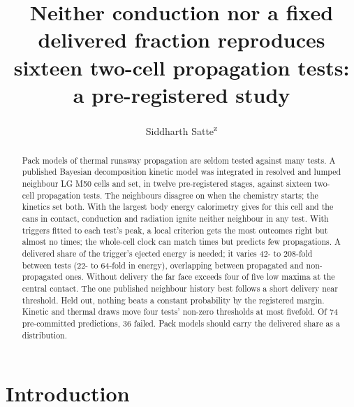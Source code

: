 \documentclass[preprint,12pt]{elsarticle}
\begin{document}
\begin{frontmatter}

\title{Neither conduction nor a fixed delivered fraction reproduces sixteen two-cell propagation tests: a pre-registered study}

\author{Siddharth Satte\textsuperscript{z}}
\address{Independent researcher, Pune, India\\[4pt]\textsuperscript{z}E-mail: siddharth161204@gmail.com}

\begin{abstract}
Pack models of thermal runaway propagation are seldom tested against many tests. A published Bayesian decomposition kinetic model was integrated in resolved and lumped neighbour LG M50 cells and set, in twelve pre-registered stages, against sixteen two-cell propagation tests. The neighbours disagree on when the chemistry starts; the kinetics set both. With the largest body energy calorimetry gives for this cell and the cans in contact, conduction and radiation ignite neither neighbour in any test. With triggers fitted to each test's peak, a local criterion gets the most outcomes right but almost no times; the whole-cell clock can match times but predicts few propagations. A delivered share of the trigger's ejected energy is needed; it varies 42- to 208-fold between tests (22- to 64-fold in energy), overlapping between propagated and non-propagated ones. Without delivery the far face exceeds four of five low maxima at the central contact. The one published neighbour history best follows a short delivery near threshold. Held out, nothing beats a constant probability by the registered margin. Kinetic and thermal draws move four tests' non-zero thresholds at most fivefold. Of 74 pre-committed predictions, 36 failed. Pack models should carry the delivered share as a distribution.
\end{abstract}


\end{frontmatter}

\section{Introduction}
\label{sec:intro}
\end{document}
